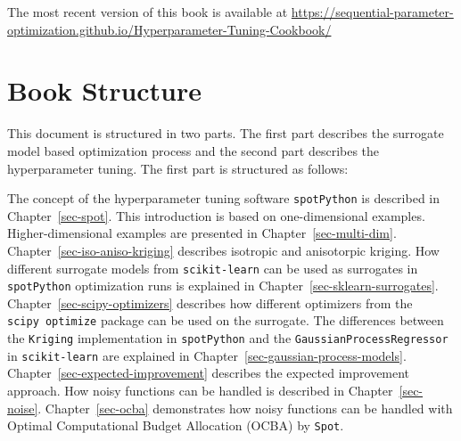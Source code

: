 \documentclass[
  letterpaper,
  DIV=11,
  numbers=noendperiod]{scrreprt}
\begin{document}
\begin{tcolorbox}[enhanced jigsaw, titlerule=0mm, colbacktitle=quarto-callout-important-color!10!white, coltitle=black, arc=.35mm, toptitle=1mm, colback=white, left=2mm, opacityback=0, bottomtitle=1mm, bottomrule=.15mm, breakable, opacitybacktitle=0.6, colframe=quarto-callout-important-color-frame, rightrule=.15mm, toprule=.15mm, leftrule=.75mm, title=\textcolor{quarto-callout-important-color}{\faExclamation}\hspace{0.5em}{Important: This book is still under development.}]

The most recent version of this book is available at
\url{https://sequential-parameter-optimization.github.io/Hyperparameter-Tuning-Cookbook/}

\end{tcolorbox}

\hypertarget{book-structure}{%
\section*{Book Structure}\label{book-structure}}


This document is structured in two parts. The first part describes the
surrogate model based optimization process and the second part describes
the hyperparameter tuning. The first part is structured as follows:

The concept of the hyperparameter tuning software \texttt{spotPython} is
described in Chapter~\ref{sec-spot}. This introduction is based on
one-dimensional examples. Higher-dimensional examples are presented in
Chapter~\ref{sec-multi-dim}. Chapter~\ref{sec-iso-aniso-kriging}
describes isotropic and anisotorpic kriging. How different surrogate
models from \texttt{scikit-learn} can be used as surrogates in
\texttt{spotPython} optimization runs is explained in
Chapter~\ref{sec-sklearn-surrogates}. Chapter~\ref{sec-scipy-optimizers}
describes how different optimizers from the \texttt{scipy\ optimize}
package can be used on the surrogate. The differences between the
\texttt{Kriging} implementation in \texttt{spotPython} and the
\texttt{GaussianProcessRegressor} in \texttt{scikit-learn} are explained
in Chapter~\ref{sec-gaussian-process-models}.
Chapter~\ref{sec-expected-improvement} describes the expected
improvement approach. How noisy functions can be handled is described in
Chapter~\ref{sec-noise}. Chapter~\ref{sec-ocba} demonstrates how noisy
functions can be handled with Optimal Computational Budget Allocation
(OCBA) by \texttt{Spot}.
\end{document}
